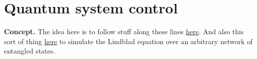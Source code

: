 \chapter{\sffamily Quantum system control}

{\bfseries\sffamily Concept.} The idea here is to follow stuff along these lines \href{https://arxiv.org/pdf/1210.7127.pdf}{here}. And also this sort of thing \href{https://en.wikipedia.org/wiki/Quantum_jump_method}{here} to simulate the Lindblad equation over an arbitrary network of entangled states.